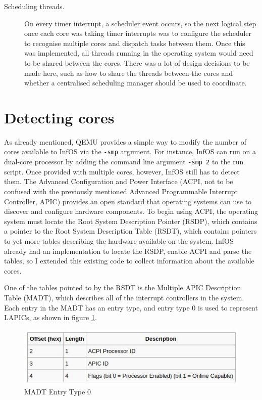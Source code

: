 \documentclass[bsc,frontabs,twoside,singlespacing,parskip,deptreport]{infthesis}     %
\begin{document}
\begin{description}
\item[Scheduling threads.] On every timer interrupt, a scheduler event occurs, so the next logical step once each core was taking timer interrupts was to configure the scheduler to recognise multiple cores and dispatch tasks between them. Once this was implemented, all threads running in the operating system would need to be shared between the cores. There was a lot of design decisions to be made here, such as how to share the threads between the cores and whether a centralised scheduling manager should be used to coordinate.
\end{description}

\section{Detecting cores} \label{detecting-cores}
As already mentioned, QEMU provides a simple way to modify the number of cores available to InfOS via the \verb|-smp| argument. For instance, InfOS can run on a dual-core processor by adding the command line argument \verb|-smp 2| to the run script. Once provided with multiple cores, however, InfOS still has to detect them. The Advanced Configuration and Power Interface (ACPI, not to be confused with the previously mentioned Advanced Programmable Interrupt Controller, APIC) provides an open standard that operating systems can use to discover and configure hardware components. To begin using ACPI, the operating system must locate the Root System Description Pointer (RSDP), which contains a pointer to the Root System Description Table (RSDT), which contains pointers to yet more tables describing the hardware available on the system. InfOS already had an implementation to locate the RSDP, enable ACPI and parse the tables, so I extended this existing code to collect information about the available cores. 

One of the tables pointed to by the RSDT is the Multiple APIC Description Table (MADT), which describes all of the interrupt controllers in the system. Each entry in the MADT has an entry type, and entry type 0 is used to represent LAPICs, as shown in figure \ref{madtentry0}. 

\begin{figure}[h]
    \centering
    \includegraphics[scale=0.7]{madtentry0.jpg}
    \caption{MADT Entry Type 0 \cite{osdev-madt}}
    \label{madtentry0}
\end{figure}
\end{document}
